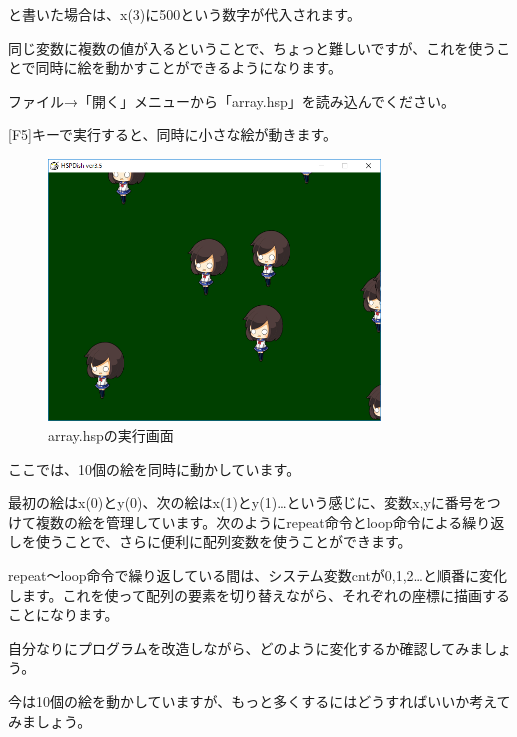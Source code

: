 \begin{description}
    \item {}
    \item {}
\end{description}

と書いた場合は、x(3)に500という数字が代入されます。

同じ変数に複数の値が入るということで、ちょっと難しいですが、これを使うことで同時に絵を動かすことができるようになります。

ファイル→「開く」メニューから「array.hsp」を読み込んでください。

[F5]キーで実行すると、同時に小さな絵が動きます。

\begin{figure}[H]
    \begin{center}
      \includegraphics[keepaspectratio,width=8.811cm,height=6.946cm]{text04-img/s_array.png}
      \caption{array.hspの実行画面}
    \end{center}
    \label{fig:prog_menu}
\end{figure}

ここでは、10個の絵を同時に動かしています。

最初の絵はx(0)とy(0)、次の絵はx(1)とy(1)…という感じに、変数x,yに番号をつけて複数の絵を管理しています。次のようにrepeat命令とloop命令による繰り返しを使うことで、さらに便利に配列変数を使うことができます。


\begin{description}
    \item {}
    \item {}
    \item {}
    \item {}
\end{description}

repeat〜loop命令で繰り返している間は、システム変数cntが0,1,2…と順番に変化します。これを使って配列の要素を切り替えながら、それぞれの座標に描画することになります。

自分なりにプログラムを改造しながら、どのように変化するか確認してみましょう。

今は10個の絵を動かしていますが、もっと多くするにはどうすればいいか考えてみましょう。





